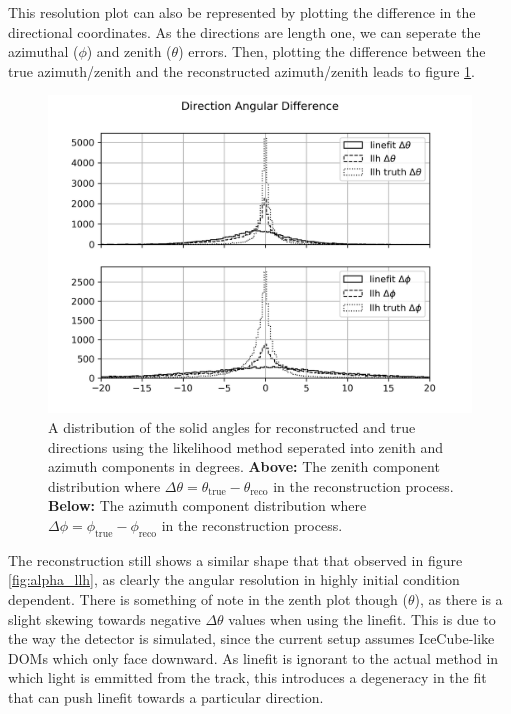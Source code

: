 This resolution plot can also be represented by plotting the difference in the directional coordinates. As the directions are length one, we can seperate the azimuthal ($\phi$) and zenith ($\theta$) errors. Then, plotting the difference between the true azimuth/zenith and the reconstructed azimuth/zenith leads to figure \ref{fig:alpha_llh_sep}. 

\begin{figure}[H]
  \centering
  \includegraphics[width=12cm]{./Figures/reco_plots/angular_diff_dir.png}
  \caption{A distribution of the solid angles for reconstructed and true directions using the likelihood method seperated into zenith and azimuth components in degrees. \textbf{Above:} The zenith component distribution where $\Delta\theta = \theta_{\text{true}} - \theta_{\text{reco}}$ in the reconstruction process. \textbf{Below:} The azimuth component distribution where $\Delta\phi = \phi_{\text{true}} - \phi_{\text{reco}}$ in the reconstruction process.}
  \label{fig:alpha_llh_sep}
\end{figure}

The reconstruction still shows a similar shape that that observed in figure \ref{fig:alpha_llh}, as clearly the angular resolution in highly initial condition dependent. There is something of note in the zenth plot though ($\theta$), as there is a slight skewing towards negative $\Delta\theta$ values when using the linefit. This is due to the way the detector is simulated, since the current setup assumes IceCube-like DOMs which only face downward. As linefit is ignorant to the actual method in which light is emmitted from the track, this introduces a degeneracy in the fit that can push linefit towards a particular direction.

